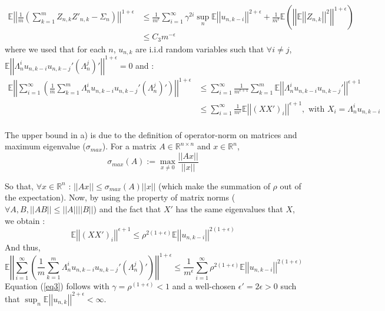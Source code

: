 \documentclass[11pt]{article}
\begin{document}
\begin{equation}\label{eq3}
\begin{split}
\mathbb{E}\left|\left|\frac{1}{m} \left(\sum_{k=1}^m Z_{n,k}Z'_{n,k} - \Sigma_n \right)\right|\right| ^ {1+\epsilon} & \leq \frac{1}{m^\epsilon} \sum_{i=1}^\infty \gamma^{2i} \sup_{n} \mathbb{E}\left|\left|u_{n,k-i}\right|\right|^{2+\epsilon}
+ \frac{1}{m^\epsilon} \mathbb{E}\left(\left|\left|\mathbb{E}\left|\left|Z_{n,k}\right|\right|^2\right|\right|^{1+\epsilon}\right) \\
& \leq C_3m^{-\epsilon}
\end{split}
\end{equation}
where we used that for each $n$,  $u_{n,k}$ are i.i.d random variables such that $\forall i \neq j$, $\mathbb{E}\left|\left|\Lambda_n^i u_{n,k-i}u_{n,k-j}' (\Lambda_n^j)'\right|\right|^{1+\epsilon} = 0$ and : 
\begin{equation}
\begin{split}
\mathbb{E} \left|\left| \sum_{i=1}^\infty \left(\frac{1}{m} \sum^m_{k=1}  \Lambda_n^i u_{n,k-i}u_{n,k-j}' (\Lambda_n^j)'\right) \right|\right|^{1+\epsilon} & \leq  \sum_{i=1}^\infty \frac{1}{m^{\epsilon +1}} \sum^m_{k=1} \mathbb{E} \left|\left|  \Lambda_n^i u_{n,k-i}u_{n,k-j}' \right| \right|^{\epsilon+1} \\
& \leq  \sum_{i=1}^\infty \frac{1}{m^{\epsilon}}\mathbb{E} \left|\left|(XX')_i\right| \right|^{\epsilon+1} , \text{ with } X_i = \Lambda_n^i u_{n,k-i} \\
\end{split}
\end{equation}

The upper bound in a) is due to the definition of operator-norm on matrices and maximum eigenvalue ($\sigma_{max}$). For a matrix $A \in \mathbb{R}^{n\times n}$ and $x \in \mathbb{R}^n$, 
$$ \sigma_{max}(A) := \max_{x \neq 0 } \frac{\left|\left|Ax \right|\right|}{||x||} $$ 

So that, $\forall x \in \mathbb{R}^n$ : $\left|\left|Ax \right|\right| \leq \sigma_{max}(A)||x||$ (which make the summation of $\rho$ out of the expectation). Now, by using the property of matrix norms ($\forall A,B , ||AB|| \leq ||A||||B||$) and the fact that $X'$ has the same eigenvalues that $X$, we obtain :
$$\mathbb{E} \left|\left|(XX')_i\right| \right|^{\epsilon+1} \leq \rho^{2(1+\epsilon)} \mathbb{E} \left|\left|u_{n,k-i}\right|\right|^{2(1+\epsilon)}$$
And thus,
$$\mathbb{E} \left|\left| \sum_{i=1}^\infty \left(\frac{1}{m} \sum^m_{k=1}  \Lambda_n^i u_{n,k-i}u_{n,k-j}' (\Lambda_n^j)'\right) \right|\right|^{1+\epsilon}  \leq \frac{1}{m^{\epsilon}} \sum_{i=1}^\infty \rho^{2(1+\epsilon)}\mathbb{E} \left|\left|u_{n,k-i}\right|\right|^{2(1+\epsilon)}  $$
Equation (\ref{eq3}) follows with $\gamma = \rho^{(1+\epsilon)} < 1$ and a well-chosen $\epsilon' = 2\epsilon >0$ such that $\sup_n \mathbb{E}\left|\left|u_{n,k}\right|\right|^{2+\epsilon} < \infty$.
\end{document}
